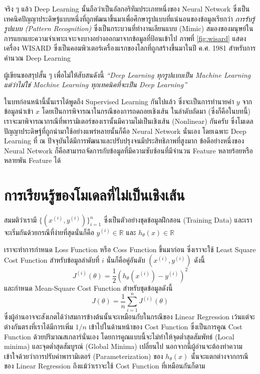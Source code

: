 จริง ๆ แล้ว Deep Learning นั้นถือว่าเป็นอัลกอริทึมประเภทหนึ่งของ Neural Network ซึ่งเป็นเทคนิคปัญญาประดิษฐ์แบบหนึ่งที่ถูกพัฒนาขึ้นมาเพื่อศึกษารูปแบบที่แน่นอนของข้อมูลเรียกว่า \textit{การรับรู้รูปแบบ (Pattern Recognition)} ซึ่งเป็นกระบวนที่ทำงานเลียนแบบ (Mimic) สมองของมนุษย์ในการแยกแยะความจำเพาะเจาะจงบางอย่างออกมาจากข้อมูลที่ป้อนเข้าไป ภาพที่ \ref{fig:wisard} แสดงเครื่อง WISARD ซึ่งเป็นคอมพิวเตอร์เครื่องแรกของโลกที่ถูกสร้างขึ้นมาในปี ค.ศ. 1981 สำหรับการคำนวณ Deep Learning

ผู้เขียนขอสรุปสั้น ๆ เพื่อไม่ให้สับสนดังนี้ \textit{\enquote{Deep Learning ทุกรูปแบบเป็น Machine Learning แต่ว่าไม่ใช่ Machine Learning ทุกเทคนิคที่จะเป็น Deep Learning}}

ในบทก่อนหน้านี้นั้นเราได้พูดถึง Supervised Learning กันไปแล้ว ซึ่งจะเป็นการทำนายค่า $y$ จากข้อมูลนำเข้า $x$ โดยเป็นการพิจารณาในกรณีของการถดถอยเชิงเส้น ในลำดับถัดมา (ซึ่งก็คือในบทนี้) เราจะมาพิจารณากรณีที่พารามิเตอร์ของเรานั้นมีความไม่เป็นเชิงเส้น (Nonlinear) กันครับ ซึ่งโมเดลปัญญาประดิษฐ์ที่ถูกนำมาใช้อย่างแพร่หลายนั้นก็คือ Neural Network นั่นเอง โดยเฉพาะ Deep Learning ที่ ณ ปัจจุบันได้มีการพัฒนาและปรับปรุงจนมีประสิทธิภาพที่สูงมาก ข้อดีอย่างหนึ่งของ Neural Network ก็คือสามารถจัดการกับข้อมูลที่มีความซับซ้อนที่มีจำนวน Feature หลายร้อยหรือหลายพัน Feature ได้

\section{การเรียนรู้ของโมเดลที่ไม่เป็นเชิงเส้น}
\label{sec:nonlinear_ml}

สมมติว่าเรามี $\{(x^{(i)}, y^{(i)})\}^n_{i=1}$ ซึ่งเป็นตัวอย่างชุดข้อมูลฝึกสอน (Training Data) และเราจะเริ่มกันด้วยกรณีที่ง่ายที่สุดนั่นก็คือ $y^{(i)} \in \mathbb{R}$ และ $h_\theta(x) \in \mathbb{R}$

เราจะทำการกำหนด Loss Function หรือ Coss Function ขึ้นมาก่อน ซึ่งเราจะใช้ Least Square Cost Function สำหรับข้อมูลลำดับที่ $i$
นั่นก็คือคู่อันดับ $(x^{(i)} ,y^{(i)})$ ดังนี้
%
\begin{equation}\label{eq:loss}
    J^{(i)} (\theta) = \frac{1}{2} \left(h_\theta (x^{(i)}) - y^{(i)}\right)^2
\end{equation}
%
\noindent และกำหนด Mean-Square Cost Function สำหรับชุดข้อมูลดังนี้
%
\begin{equation}\label{eq:mse_loss}
    J(\theta) = \frac 1 n \sum_{i=1}^n J^{(i)}(\theta)
\end{equation}
%
\noindent ซึ่งผู้อ่านอาจจะสังเกตได้ว่าสมการข้างต้นนั้นจะเหมือนกับในกรณีของ Linear Regression เว้นแต่จะต่างกันตรงที่เราได้มีการเพิ่ม $1/n$ เข้าไปในด้านหน้าของ Cost Function ซึ่งเป็นการคูณ Cost Function ด้วยปริมาณสเกลาร์นั่นเอง โดยการคูณแบบนี้จะไม่ทำให้จุดต่ำสุดสัมพัทธ์ (Local minima) และจุดต่ำสุดสัมบูรณ์ (Global Minima) เปลี่ยนไป นอกจากนี้ผู้อ่านจะต้องทำความเข้าใจด้วยว่าการปรับค่าพารามิเตอร์ (Parameterization) ของ $h_\theta(x)$ นั้นจะแตกต่างจากกรณีของ Linear Regression ถึงแม้ว่าเราจะใช้ Cost Function ที่เหมือนกันก็ตาม

